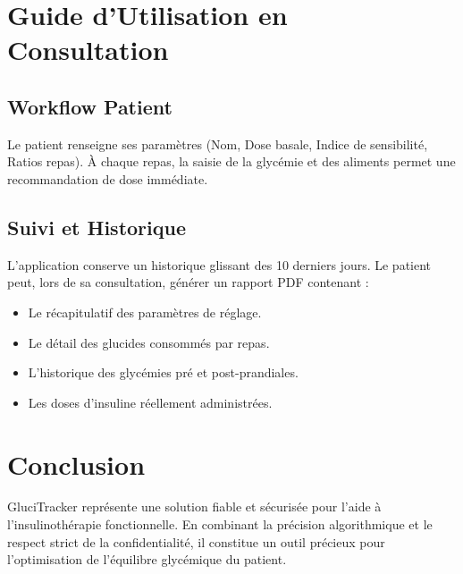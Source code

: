 \documentclass[11pt, a4paper]{report}
\begin{document}
\newpage

\section{Guide d'Utilisation en Consultation}

\subsection{Workflow Patient}
Le patient renseigne ses paramètres (Nom, Dose basale, Indice de sensibilité, Ratios repas). À chaque repas, la saisie de la glycémie et des aliments permet une recommandation de dose immédiate.

\subsection{Suivi et Historique}
L'application conserve un historique glissant des 10 derniers jours. Le patient peut, lors de sa consultation, générer un rapport PDF contenant :
\begin{itemize}
    \item Le récapitulatif des paramètres de réglage.
    \item Le détail des glucides consommés par repas.
    \item L'historique des glycémies pré et post-prandiales.
    \item Les doses d'insuline réellement administrées.
\end{itemize}

\section*{Conclusion}
GluciTracker représente une solution fiable et sécurisée pour l'aide à l'insulinothérapie fonctionnelle. En combinant la précision algorithmique et le respect strict de la confidentialité, il constitue un outil précieux pour l'optimisation de l'équilibre glycémique du patient.
\end{document}
